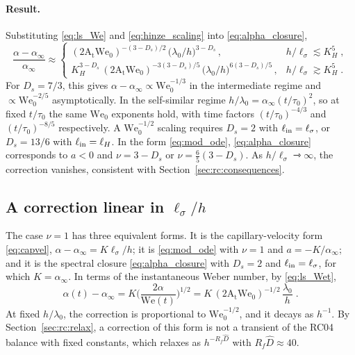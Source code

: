 \documentclass[11pt]{article}
\numberwithin{equation}{section}
\newcommand{\At}{\mathrm{A_t}}
\newcommand{\We}{\mathrm{We}_0}
\newcommand{\ls}{\ell_\sigma}
\begin{document}
\paragraph{Result.} Substituting \eqref{eq:ls_We} and \eqref{eq:hinze_scaling} into \eqref{eq:alpha_closure},
\begin{equation}\label{eq:We_scaling}
\frac{\alpha - \alpha_\infty}{\alpha_\infty} \approx
\begin{cases}
(2 \At \We)^{-(3 - D_s)/2} \, \big(\lambda_0/h\big)^{3 - D_s} \, , & h/\ls \lesssim K_H^5 \;, \\[4pt]
K_H^{3 - D_s} \,(2 \At \We)^{-3(3 - D_s)/5} \, \big(\lambda_0/h\big)^{6(3 - D_s)/5} \, , & h/\ls \gtrsim K_H^5 \;.
\end{cases}
\end{equation}
For $D_s = 7/3$, this gives $\alpha - \alpha_\infty \propto \We^{-1/3}$ in the intermediate regime and $\propto \We^{-2/5}$ asymptotically. In the self-similar regime $h/\lambda_0 = \alpha_\infty(t/\tau_0)^2$, so at fixed $t/\tau_0$ the same $\We$ exponents hold, with time factors $(t/\tau_0)^{-4/3}$ and $(t/\tau_0)^{-8/5}$ respectively. A $\We^{-1/2}$ scaling requires $D_s = 2$ with $\ell_{\rm in} = \ls$, or $D_s = 13/6$ with $\ell_{\rm in} = \ell_H$. In the form \eqref{eq:mod_ode}, \eqref{eq:alpha_closure} corresponds to $a < 0$ and $\nu = 3 - D_s$ or $\nu = \tfrac65(3 - D_s)$. As $h/\ls \rightarrowtriangle \infty$, the correction vanishes, consistent with Section~\ref{sec:rc:consequences}.

\subsection{A correction linear in \texorpdfstring{$\ls/h$}{l_sigma/h}}\label{sec:scaling:linear}
The case $\nu = 1$ has three equivalent forms. It is the capillary-velocity form \eqref{eq:capvel}, $\alpha - \alpha_\infty = K \ls/h$; it is \eqref{eq:mod_ode} with $\nu = 1$ and $a = -K/\alpha_\infty$; and it is the spectral closure \eqref{eq:alpha_closure} with $D_s = 2$ and $\ell_{\rm in} = \ls$, for which $K = \alpha_\infty$. In terms of the instantaneous Weber number, by \eqref{eq:ls_Wet},
\begin{equation}\label{eq:linear_We}
\alpha(t) - \alpha_\infty = K \Big(\frac{2 \alpha}{\mathrm{We}(t)}\Big)^{1/2}
= K \,(2 \At \We)^{-1/2} \, \frac{\lambda_0}{h} \;.
\end{equation}
At fixed $h/\lambda_0$, the correction is proportional to $\We^{-1/2}$, and it decays as $h^{-1}$. By Section~\ref{sec:rc:relax}, a correction of this form is not a transient of the RC04 balance with fixed constants, which relaxes as $h^{-R_f \hat D}$ with $R_f \hat D \approx 40$.
\end{document}
